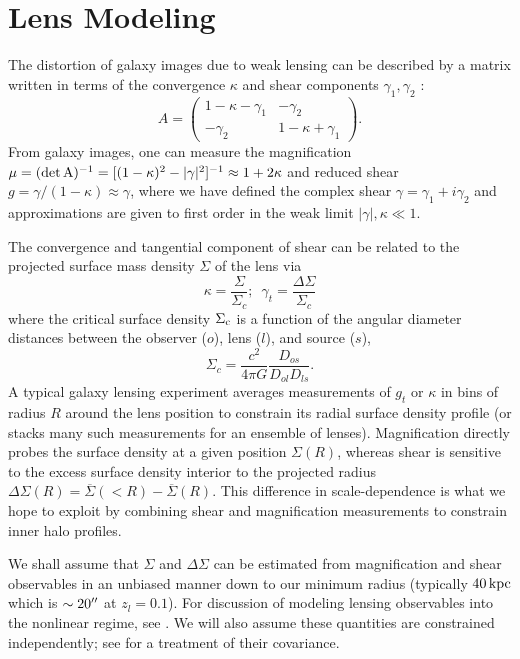 \documentclass[12pt]{emulateapj}
\begin{document}
\section{Lens Modeling}

The distortion of galaxy images due to weak lensing can be described
by a matrix written in terms of the convergence $\kappa$ and shear
components $\gamma_1, \gamma_2$ \citep[e.g.][]{Bartelmann2001}:
\begin{equation}
A = \left( \begin{array}{cc}
1 - \kappa -\gamma_1 & -\gamma_2 \\
-\gamma_2 & 1 - \kappa + \gamma_1 \end{array} \right).
\end{equation}
From galaxy images, one can measure the magnification 
$\mu = (\rm{det}\,A)^{-1} = [(1-\kappa)^2 - |\gamma|^2]^{-1} \approx 1+2\kappa$
and reduced shear $g = \gamma / (1-\kappa) \approx \gamma$, where we have defined the
complex shear $\gamma=\gamma_1 + i\gamma_2$ and approximations are
given to first order in the weak limit $|\gamma|,\kappa \ll 1$.

The convergence and tangential component of shear can be related to the
projected surface mass density $\Sigma$ of the lens via
\begin{equation}
\kappa = \frac{\Sigma}{\Sigma_c}; \,\,\, \gamma_t = \frac{\Delta\Sigma}{\Sigma_c}
\end{equation}
where the critical surface density $\Sigma_{\rm  c}$ is a function of
the angular diameter distances between the observer ($o$), lens ($l$),
and source ($s$),
\begin{equation}
\Sigma_{c}=\frac{c^2}{4\pi G}\frac{D_{os}}{D_{ol}D_{ls}}.
\end{equation}
A typical galaxy lensing experiment averages measurements of $g_t$ or $\kappa$ in
bins of radius $R$ around the lens position to constrain its radial
surface density profile (or stacks many such measurements for an
ensemble of lenses). Magnification directly probes the surface density
at a given position $\Sigma(R)$, whereas shear is sensitive to the
excess surface density interior to the projected radius
$\Delta\Sigma(R) = \overline{\Sigma}(<R) - \overline{\Sigma}(R)$. This
difference in scale-dependence is what we hope to exploit by combining
shear and magnification measurements to constrain inner halo profiles.

We shall assume that $\Sigma$ and $\Delta\Sigma$ can be estimated from
magnification and shear observables in an unbiased manner down to our
minimum radius (typically $40\,\rm{kpc}$ which is $\sim20\mbox{$^{\prime\prime}$}$ at
$z_l=0.1$). For discussion of modeling lensing observables into the
nonlinear regime, see \citet{Menard2003, Takada2003,
  Mandelbaum2006}. We will also assume these quantities are
constrained independently; see \citet{Rozo2010} for a treatment of
their covariance.
\end{document}
